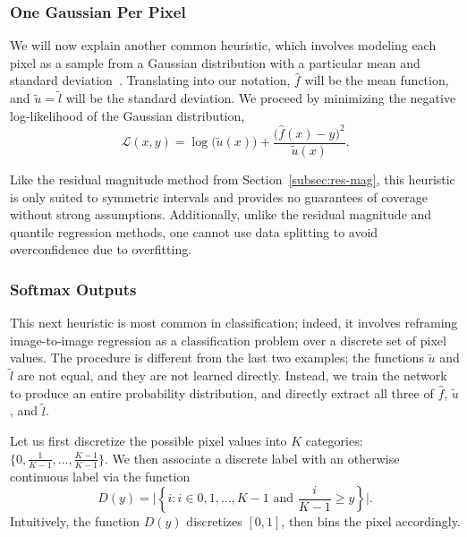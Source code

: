 \documentclass[10pt]{article}
\begin{document}
\subsubsection{One Gaussian Per Pixel}
We will now explain another common heuristic, which involves modeling each pixel as a sample from a Gaussian distribution with a particular mean and standard deviation~\cite{nix1994estimating}.
Translating into our notation, $\hat{f}$ will be the mean function, and $\tilde{u}=\tilde{l}$ will be the standard deviation.
We proceed by minimizing the negative log-likelihood of the Gaussian distribution,
\begin{equation}
    \mathcal{L}(x,y) = \log\big(\tilde{u}(x)\big) + \frac{\big(\hat{f}(x)-y\big)^2}{\tilde{u}(x)}.
\end{equation}

Like the residual magnitude method from Section~\ref{subsec:res-mag}, this heuristic is only suited to symmetric intervals and provides no guarantees of coverage without strong assumptions.
Additionally, unlike the residual magnitude and quantile regression methods, one cannot use data splitting to avoid overconfidence due to overfitting.

\subsubsection{Softmax Outputs}
This next heuristic is most common in classification; indeed, it involves reframing image-to-image regression as a classification problem over a discrete set of pixel values.
The procedure is different from the last two examples; the functions $\tilde{u}$ and $\tilde{l}$ are not equal, and they are not learned directly. 
Instead, we train the network to produce an entire probability distribution, and directly extract all three of $\hat{f}$, $\tilde{u}$, and $\tilde{l}$.

Let us first discretize the possible pixel values into $K$ categories: $\{0, \frac{1}{K-1}, ..., \frac{K-1}{K-1}\}$.
We then associate a discrete label with an otherwise continuous label via the function 
\begin{equation}
    D(y) = \bigg|\left\{ i : i \in 0,1,...,K-1 \text{ and } \frac{i}{K-1} \geq y \right\}\bigg|.
\end{equation}
Intuitively, the function $D(y)$ discretizes $[0,1]$, then bins the pixel accordingly.
\end{document}
